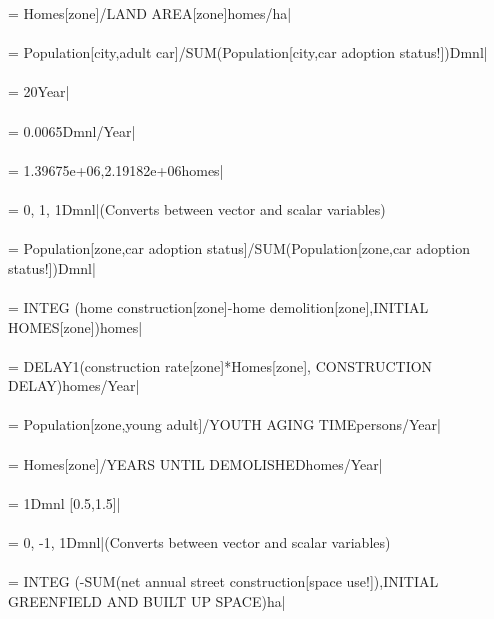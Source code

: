  = {\small Homes[zone]/LAND AREA[zone]homes/ha|} \\ \\ 
 = {\small Population[city,adult car]/SUM(Population[city,car adoption status!])Dmnl|} \\ \\ 
 = {\small 20Year|} \\ \\ 
 = {\small 0.0065Dmnl/Year|} \\ \\ 
 = {\small 1.39675e+06,2.19182e+06homes|} \\ \\ 
 = {\small 0, 1, 1Dmnl|}{\small  (Converts between vector and scalar variables)} \\ \\ 
 = {\small Population[zone,car adoption status]/SUM(Population[zone,car adoption status!])Dmnl|} \\ \\ 
 = {\small  INTEG (home construction[zone]-home demolition[zone],INITIAL HOMES[zone])homes|} \\ \\ 
 = {\small DELAY1(construction rate[zone]*Homes[zone], CONSTRUCTION DELAY)homes/Year|} \\ \\ 
 = {\small Population[zone,young adult]/YOUTH AGING TIMEpersons/Year|} \\ \\ 
 = {\small Homes[zone]/YEARS UNTIL DEMOLISHEDhomes/Year|} \\ \\ 
 = {\small 1Dmnl [0.5,1.5]|} \\ \\ 
 = {\small 0, -1, 1Dmnl|}{\small  (Converts between vector and scalar variables)} \\ \\ 
 = {\small  INTEG (-SUM(net annual street construction[space use!]),INITIAL GREENFIELD AND BUILT UP SPACE)ha|} \\ \\ 
